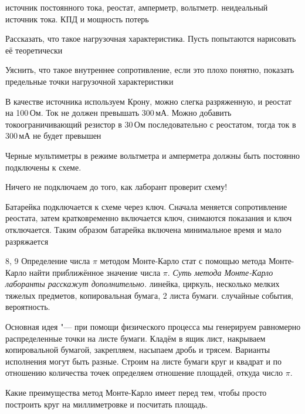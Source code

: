 \begin{enumerate}
		{источник постоянного тока, реостат, амперметр, вольтметр.}
		{неидеальный источник тока. КПД и мощность потерь}
		{\item Рассказать, что такое нагрузочная характеристика. Пусть попытаются нарисовать её теоретически
		\item Уяснить, что такое внутреннее сопротивление, если это плохо понятно, показать предельные точки нагрузочной характеристики
		\item В качестве источника используем Крону, можно слегка разряженную, и реостат на 100\,Ом. Ток не должен превышать 300\,мА. Можно добавить токоограничивающий резистор в 30\,Ом последовательно с реостатом, тогда ток в 300\,мА не будет превышен
		\item Черные мультиметры в режиме вольтметра и амперметра должны быть постоянно подключены к схеме.
		\item Ничего не подключаем до того, как лаборант проверит схему!
		\item Батарейка подключается к схеме через ключ. Сначала меняется сопротивление реостата, затем кратковременно включается ключ, снимаются показания и ключ отключается. Таким образом батарейка включена минимальное время и мало разряжается}
	\item \labtitle
		{8, 9}
		{Определение числа $\pi$ методом Монте-Карло}
		{стат}
		{с помощью метода Монте-Карло найти приближённое значение числа $\pi$. \textit{Суть метода Монте-Карло лаборанты расскажут дополнительно.}}
		{линейка, циркуль, несколько мелких тяжелых предметов, копировальная бумага, 2 листа бумаги.}
		{случайные события, вероятность.}
		{\item Основная идея "--- при помощи физического процесса мы генерируем равномерно распределенные точки на листе бумаги. Кладём в ящик лист, накрываем копировальной бумагой, закрепляем, насыпаем дробь и трясем. Варианты исполнения могут быть разные. Строим на листе бумаги круг и квадрат и по отношению количества точек определяем отношение площадей, откуда число $\pi$.
		\item Какие преимущества метод Монте-Карло имеет перед тем, чтобы просто построить круг на миллиметровке и посчитать площадь. }
	\item \labtitle

\end{enumerate}
